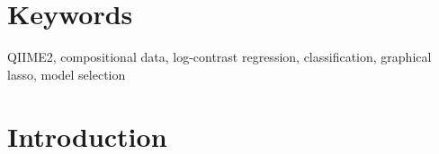 \documentclass[10pt,a4paper]{article}
\begin{document}






\section*{\color{f1ROrange}Keywords}

QIIME2, compositional data, log-contrast regression, classification, graphical lasso, model selection

\clearpage
\pagestyle{fancy}
\section*{Introduction}
\end{document}
